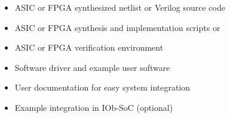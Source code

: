 \begin{itemize}
\item ASIC or FPGA synthesized netlist or Verilog source code
\item ASIC or FPGA synthesis and implementation scripts or
\item ASIC or FPGA verification environment
\item Software driver and example user software
\item User documentation for easy system integration
\item Example integration in IOb-SoC (optional)
\end{itemize}
